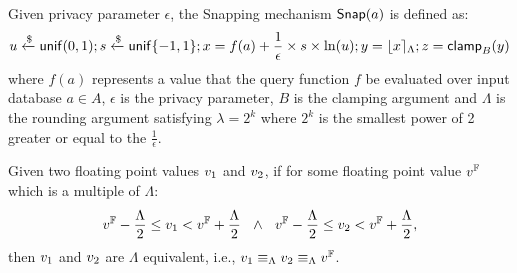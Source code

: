 \documentclass[a4paper,11pt]{article}
\begin{document}
\begin{defn}
Given privacy parameter $\epsilon$, the Snapping mechanism $\mathsf{Snap}(a)$ is defined as:
\[
	u \xleftarrow{\$} \mathsf{unif}(0,1); s \xleftarrow{\$} \mathsf{unif}\{-1, 1\};
	x = f(a) + \frac{1}{\epsilon} \times s \times \ln (u);
	y = \lfloor x \rceil_{\Lambda};
	z = \mathsf{clamp}_B (y)
\]
where $f(a)$ represents a value that the query function $f$ be evaluated over input database $a \in A$, $\epsilon$ is the privacy parameter, $B$ is the clamping argument and $\Lambda$ is the rounding argument satisfying $\lambda = 2^k$ where $2^k$ is the smallest power of 2 greater or equal to the $\frac{1}{\epsilon}$.
\end{defn}

\begin{defn}
Given two floating point values $v_1$ and $v_2$, if for some floating point value $v^{\mathbb{F}}$ which is a multiple of $\Lambda$:
\[
	v^{\mathbb{F}} - \frac{\Lambda}{2} \leq v_1 < v^{\mathbb{F}} + \frac{\Lambda}{2}
	~~
	\land
	~~
	v^{\mathbb{F}} - \frac{\Lambda}{2} \leq v_2 < v^{\mathbb{F}} + \frac{\Lambda}{2},	
\]
then $v_1$ and $v_2$ are $\Lambda$ equivalent, i.e., 
$v_1 \equiv_{\Lambda} v_2 \equiv_{\Lambda} v^{\mathbb{F}}$.
\end{defn}
%
\end{document}
